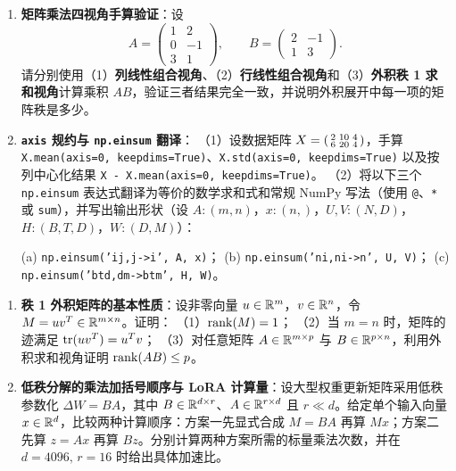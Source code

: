 \begin{enumerate}[label=\textbf{1.\arabic*}, resume]
  \item \textbf{矩阵乘法四视角手算验证}：设
  \[
  A = \begin{pmatrix} 1 & 2 \\ 0 & -1 \\ 3 & 1 \end{pmatrix}, \qquad
  B = \begin{pmatrix} 2 & -1 \\ 1 & 3 \end{pmatrix}.
  \]
  请分别使用（1）\textbf{列线性组合视角}、（2）\textbf{行线性组合视角}和（3）\textbf{外积秩 1 求和视角}计算乘积 $AB$，验证三者结果完全一致，并说明外积展开中每一项的矩阵秩是多少。

  \item \textbf{\texttt{axis} 规约与 \texttt{np.einsum} 翻译}：
  （1）设数据矩阵 $X = \begin{psmallmatrix} 2 & 10 & 4 \\ 6 & 20 & 4 \end{psmallmatrix}$，手算 \texttt{X.mean(axis=0, keepdims=True)}、\texttt{X.std(axis=0, keepdims=True)} 以及按列中心化结果 \texttt{X - X.mean(axis=0, keepdims=True)}。
  （2）将以下三个 \texttt{np.einsum} 表达式翻译为等价的数学求和式和常规 NumPy 写法（使用 \texttt{@}、\texttt{*} 或 \texttt{sum}），并写出输出形状（设 $A:(m,n)$，$x:(n,)$，$U,V:(N,D)$，$H:(B,T,D)$，$W:(D,M)$）：
  \begin{center}
  (a) \texttt{np.einsum('ij,j->i', A, x)}；\quad
  (b) \texttt{np.einsum('ni,ni->n', U, V)}；\quad
  (c) \texttt{np.einsum('btd,dm->btm', H, W)}。
  \end{center}
\end{enumerate}


\begin{enumerate}[label=\textbf{1.\arabic*}, resume]
  \item \textbf{秩 1 外积矩阵的基本性质}：设非零向量 $u \in \mathbb{R}^m$，$v \in \mathbb{R}^n$，令 $M = u v^T \in \mathbb{R}^{m \times n}$。证明：
  （1）$\operatorname{rank}(M) = 1$；
  （2）当 $m = n$ 时，矩阵的迹满足 $\operatorname{tr}(u v^T) = u^T v$；
  （3）对任意矩阵 $A \in \mathbb{R}^{m \times p}$ 与 $B \in \mathbb{R}^{p \times n}$，利用外积求和视角证明 $\operatorname{rank}(AB) \le p$。

  \item \textbf{低秩分解的乘法加括号顺序与 LoRA 计算量}：设大型权重更新矩阵采用低秩参数化 $\Delta W = B A$，其中 $B \in \mathbb{R}^{d \times r}$、$A \in \mathbb{R}^{r \times d}$ 且 $r \ll d$。给定单个输入向量 $x \in \mathbb{R}^d$，比较两种计算顺序：方案一先显式合成 $M = BA$ 再算 $Mx$；方案二先算 $z = Ax$ 再算 $Bz$。分别计算两种方案所需的标量乘法次数，并在 $d = 4096,\, r = 16$ 时给出具体加速比。
\end{enumerate}

